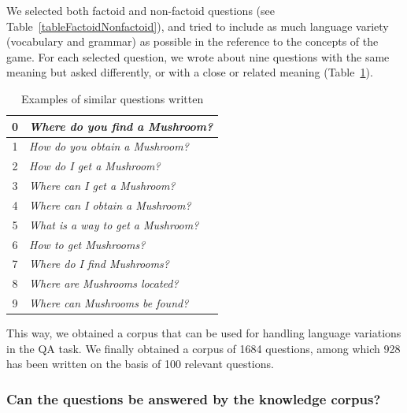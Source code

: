 \documentclass[12pt]{article}
\begin{document}
We selected both factoid and non-factoid questions (see Table~\ref{tableFactoidNonfactoid}), and tried to include as much language variety (vocabulary and grammar) as possible in the reference to the concepts of the game. For each selected question, we wrote about nine questions with the same meaning but asked differently, or with a close or related meaning (Table~\ref{tableSimilarQuestions}).

\begin{table}[!ht]
\center
\begin{tabular}{|c|l|}
\hline
0 & \textit{Where do you find a Mushroom?}\\
\hline
1 & \textit{How do you obtain a Mushroom?}\\
\hline
2 & \textit{How do I get a Mushroom?}\\
\hline
3 & \textit{Where can I get a Mushroom?}\\
\hline
4 & \textit{Where can I obtain a Mushroom?}\\
\hline
5 & \textit{What is a way to get a Mushroom?}\\
\hline
6 & \textit{How to get Mushrooms?}\\
\hline
7 & \textit{Where do I find Mushrooms?}\\
\hline
8 & \textit{Where are Mushrooms located?}\\
\hline
9 & \textit{Where can Mushrooms be found?}\\
\hline
\end{tabular}
\caption{\label{tableSimilarQuestions} Examples of similar questions written}
\end{table}

This way, we obtained a corpus that can be used for handling language variations in the QA task. We finally obtained a corpus of 1684 questions, among which 928 has been written on the basis of 100 relevant questions.

\subsubsection{Can the questions be answered by the knowledge corpus?}
\end{document}
